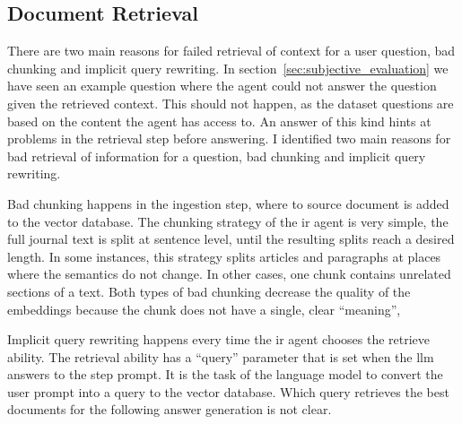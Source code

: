 \documentclass[../main.tex]{subfiles}
\begin{document}
\subsection{Document Retrieval}

There are two main reasons for failed retrieval of context for a user question,
bad chunking and implicit query rewriting.
In section~\ref{sec:subjective_evaluation} we have seen an example question where
the agent could not answer the question given the retrieved context.
This should not happen, as the dataset questions are based on the content the agent has access to.
An answer of this kind hints at problems in the retrieval step before answering.
I identified two main reasons for bad retrieval of information for a question,
bad chunking and implicit query rewriting.



Bad chunking happens in the ingestion step, where to source document is added to the
vector database.
The chunking strategy of the \gls{ir} agent is very simple, the full journal text
is split at sentence level, until the resulting splits reach a desired length.
In some instances, this strategy splits articles and paragraphs at places
where the semantics do not change.
In other cases, one chunk contains unrelated sections of a text.
Both types of bad chunking decrease the quality of the embeddings because the
chunk does not have a single, clear ``meaning'',

Implicit query rewriting happens every time the \gls{ir} agent chooses the retrieve ability.
The retrieval ability has a ``query'' parameter that is set when the \gls{llm}
answers to the step prompt.
It is the task of the language model to convert the user prompt into a query
to the vector database.
Which query retrieves the best documents for the following answer generation is not clear.
\end{document}
